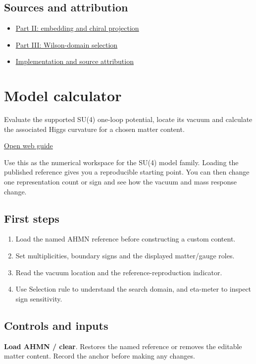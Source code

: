 \documentclass[11pt,a4paper]{article}
\begin{document}
\subsection*{Sources and attribution}
\begin{itemize}
\item \href{https://karlesmarin.github.io/ghu-explorer/papers/part-ii/index.html}{Part II: embedding and chiral projection}
\item \href{https://karlesmarin.github.io/ghu-explorer/papers/part-iii/index.html}{Part III: Wilson-domain selection}
\item \href{https://github.com/karlesmarin/ghu-lab/blob/main/src/sections/selection_section.js}{Implementation and source attribution}
\end{itemize}
\section{Model calculator}
Evaluate the supported SU(4) one-loop potential, locate its vacuum and calculate the associated Higgs curvature for a chosen matter content.

\href{https://karlesmarin.github.io/ghu-explorer/guide/calculator/index.html}{Open web guide}

Use this as the numerical workspace for the SU(4) model family. Loading the published reference gives you a reproducible starting point. You can then change one representation count or sign and see how the vacuum and mass response change.
\subsection*{First steps}
\begin{enumerate}
\item Load the named AHMN reference before constructing a custom content.
\item Set multiplicities, boundary signs and the displayed matter/gauge roles.
\item Read the vacuum location and the reference-reproduction indicator.
\item Use Selection rule to understand the search domain, and eta-meter to inspect sign sensitivity.
\end{enumerate}
\subsection*{Controls and inputs}
\textbf{Load AHMN / clear}. Restores the named reference or removes the editable matter content. Record the anchor before making any changes.
\end{document}
